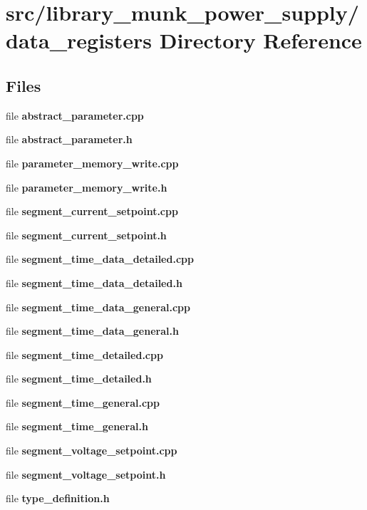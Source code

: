 \section{src/library\+\_\+munk\+\_\+power\+\_\+supply/data\+\_\+registers Directory Reference}
\label{dir_1ccd192a075a6ae83b25629d5b31f2dd}
\subsection*{Files}
\begin{DoxyCompactItemize}
\item 
file \textbf{ abstract\+\_\+parameter.\+cpp}
\item 
file \textbf{ abstract\+\_\+parameter.\+h}
\item 
file \textbf{ parameter\+\_\+memory\+\_\+write.\+cpp}
\item 
file \textbf{ parameter\+\_\+memory\+\_\+write.\+h}
\item 
file \textbf{ segment\+\_\+current\+\_\+setpoint.\+cpp}
\item 
file \textbf{ segment\+\_\+current\+\_\+setpoint.\+h}
\item 
file \textbf{ segment\+\_\+time\+\_\+data\+\_\+detailed.\+cpp}
\item 
file \textbf{ segment\+\_\+time\+\_\+data\+\_\+detailed.\+h}
\item 
file \textbf{ segment\+\_\+time\+\_\+data\+\_\+general.\+cpp}
\item 
file \textbf{ segment\+\_\+time\+\_\+data\+\_\+general.\+h}
\item 
file \textbf{ segment\+\_\+time\+\_\+detailed.\+cpp}
\item 
file \textbf{ segment\+\_\+time\+\_\+detailed.\+h}
\item 
file \textbf{ segment\+\_\+time\+\_\+general.\+cpp}
\item 
file \textbf{ segment\+\_\+time\+\_\+general.\+h}
\item 
file \textbf{ segment\+\_\+voltage\+\_\+setpoint.\+cpp}
\item 
file \textbf{ segment\+\_\+voltage\+\_\+setpoint.\+h}
\item 
file \textbf{ type\+\_\+definition.\+h}
\end{DoxyCompactItemize}
